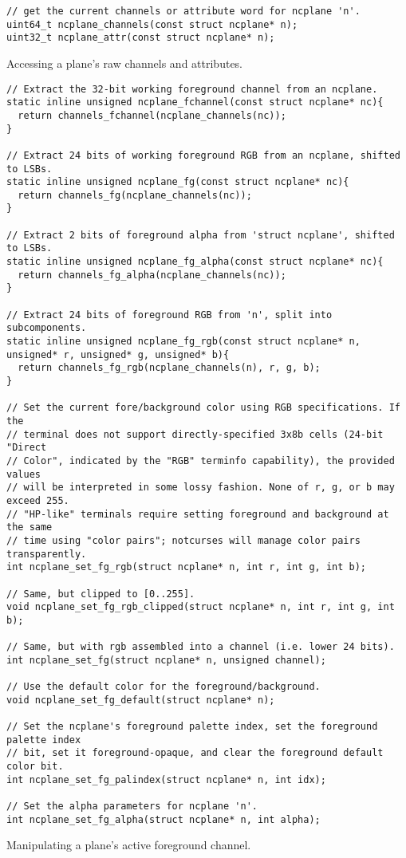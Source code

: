 \begin{listing}[!htb]
\begin{verbatim}
// get the current channels or attribute word for ncplane 'n'.
uint64_t ncplane_channels(const struct ncplane* n);
uint32_t ncplane_attr(const struct ncplane* n);
\end{verbatim}
\caption{Accessing a plane's raw channels and attributes.}
\label{listing:planeraw}
\end{listing}

\begin{listing}[!htb]
\begin{verbatim}
// Extract the 32-bit working foreground channel from an ncplane.
static inline unsigned ncplane_fchannel(const struct ncplane* nc){
  return channels_fchannel(ncplane_channels(nc));
}

// Extract 24 bits of working foreground RGB from an ncplane, shifted to LSBs.
static inline unsigned ncplane_fg(const struct ncplane* nc){
  return channels_fg(ncplane_channels(nc));
}

// Extract 2 bits of foreground alpha from 'struct ncplane', shifted to LSBs.
static inline unsigned ncplane_fg_alpha(const struct ncplane* nc){
  return channels_fg_alpha(ncplane_channels(nc));
}

// Extract 24 bits of foreground RGB from 'n', split into subcomponents.
static inline unsigned ncplane_fg_rgb(const struct ncplane* n, unsigned* r, unsigned* g, unsigned* b){
  return channels_fg_rgb(ncplane_channels(n), r, g, b);
}

// Set the current fore/background color using RGB specifications. If the
// terminal does not support directly-specified 3x8b cells (24-bit "Direct
// Color", indicated by the "RGB" terminfo capability), the provided values
// will be interpreted in some lossy fashion. None of r, g, or b may exceed 255.
// "HP-like" terminals require setting foreground and background at the same
// time using "color pairs"; notcurses will manage color pairs transparently.
int ncplane_set_fg_rgb(struct ncplane* n, int r, int g, int b);

// Same, but clipped to [0..255].
void ncplane_set_fg_rgb_clipped(struct ncplane* n, int r, int g, int b);

// Same, but with rgb assembled into a channel (i.e. lower 24 bits).
int ncplane_set_fg(struct ncplane* n, unsigned channel);

// Use the default color for the foreground/background.
void ncplane_set_fg_default(struct ncplane* n);

// Set the ncplane's foreground palette index, set the foreground palette index
// bit, set it foreground-opaque, and clear the foreground default color bit.
int ncplane_set_fg_palindex(struct ncplane* n, int idx);

// Set the alpha parameters for ncplane 'n'.
int ncplane_set_fg_alpha(struct ncplane* n, int alpha);
\end{verbatim}
\caption{Manipulating a plane's active foreground channel.}
\label{listing:planefg}
\end{listing}

